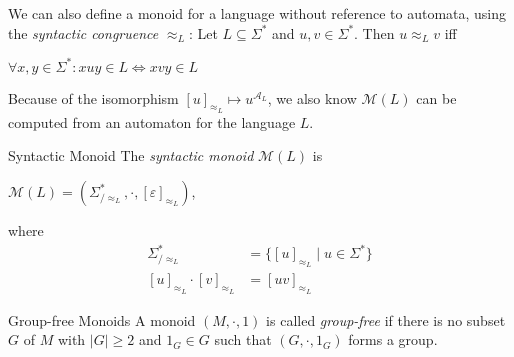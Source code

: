 \documentclass[english]{panikzettel}
\newcommand{\A}{\mathcal{A}}
\newcommand{\M}{\mathcal{M}}
\begin{document}
\begin{halfboxl}
    We can also define a monoid for a language without reference to automata, using the \emph{syntactic congruence} $\approx_L$: Let $L\subseteq \Sigma^*$ and $u,v \in \Sigma^*$. Then $u \approx_L v$ iff
    \begin{tightcenter}
        $\forall x,y \in \Sigma^*: xuy \in L \Leftrightarrow xvy \in L$
    \end{tightcenter}

    Because of the isomorphism $[u]_{\approx_L} \mapsto u^{\A_L}$, we also know $\M(L)$ can be computed from an automaton for the language $L$.
\end{halfboxl}%
\begin{halfboxr}
    \vspace{-\baselineskip}
    \begin{defi}{Syntactic Monoid}
        The \emph{syntactic monoid} $\M(L)$ is
        \begin{tightcenter}
            $\M(L) = (\Sigma^*_{/\approx_L},\cdot,[\varepsilon]_{\approx_L})$,
        \end{tightcenter}
        where
        \vspace{-\baselineskip}
        \begin{align*}
            \Sigma^*_{/\approx_L} &=\{[u]_{\approx_L} \mid u \in \Sigma^*\} \\
            [u]_{\approx_L} \cdot [v]_{\approx_L} &= [uv]_{\approx_L}
        \end{align*}
    \end{defi}
\end{halfboxr}

\begin{defi}{Group-free Monoids}
A monoid $(M,\cdot,1)$ is called \emph{group-free} if there is no subset $G$ of $M$ with $|G| \geq 2$ and $1_G \in G$ such that $(G, \cdot, 1_G)$ forms a group.
\end{defi}
\end{document}
